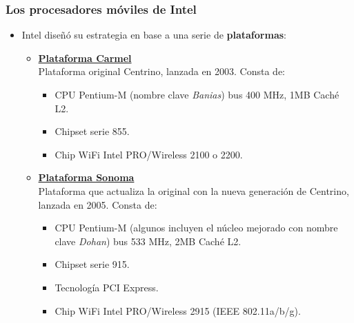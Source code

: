 \frame
{
\frametitle{Los procesadores móviles de Intel}
\begin{itemize}
 \item Intel diseñó su estrategia en base a una serie de \textbf{plataformas}:
	\begin{itemize}
		\item \textbf{\underline{Plataforma Carmel}}\\
		Plataforma original Centrino, lanzada en 2003. Consta de:
		\begin{itemize}
		\item CPU Pentium-M (nombre clave \textit{Banias}) bus 400 MHz, 1MB Caché L2.
		\item Chipset serie 855.
		\item Chip WiFi Intel PRO/Wireless 2100 o 2200.
		\end{itemize}
	
		\item \textbf{\underline{Plataforma Sonoma}}\\
		Plataforma que actualiza la original con la nueva generación de Centrino, lanzada en 2005. Consta de:
		\begin{itemize}
		\item CPU Pentium-M (algunos incluyen el núcleo mejorado con nombre clave \textit{Dohan}) bus 533 MHz, 2MB Caché L2.
		\item Chipset serie 915.
		\item Tecnología PCI Express.
		\item Chip WiFi Intel PRO/Wireless 2915 (IEEE 802.11a/b/g).
		\end{itemize}	
	\end{itemize}
\end{itemize}
}

